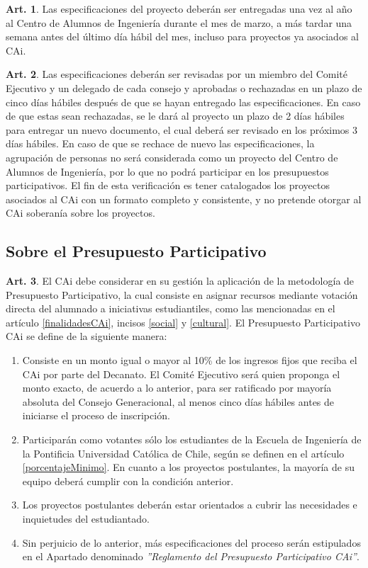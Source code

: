 \documentclass[letterpaper,11pt]{article}
\theoremstyle{definition}%
\newtheorem{art}{Art.} %
\begin{document}
\begin{art}
	Las especificaciones del proyecto deberán ser entregadas una vez al año al Centro de Alumnos de Ingeniería durante el mes de marzo, a más tardar una semana antes del último día hábil del mes, incluso para proyectos ya asociados al CAi.
\end{art}

\begin{art}
	Las especificaciones deberán ser revisadas por un miembro del Comité Ejecutivo y un delegado de cada consejo y aprobadas o rechazadas en un plazo de cinco días hábiles después de que se hayan entregado las especificaciones. En caso de que estas sean rechazadas, se le dará al proyecto un plazo de 2 días hábiles para entregar un nuevo documento, el cual deberá ser revisado en los próximos 3 días hábiles. En caso de que se rechace de nuevo las especificaciones, la agrupación de personas no será considerada como un proyecto del Centro de Alumnos de Ingeniería, por lo que no podrá participar en los presupuestos participativos. El fin de esta verificación es tener catalogados los proyectos asociados al CAi con un formato completo y consistente, y no pretende otorgar al CAi soberanía sobre los proyectos.
\end{art}


\subsection*{Sobre el Presupuesto Participativo}

\begin{art}\label{definicionPParticipativo1}
	El CAi debe considerar en su gestión la aplicación de la metodología de Presupuesto Participativo, la cual consiste en asignar recursos mediante votación directa del alumnado a iniciativas estudiantiles, como las mencionadas en el artículo \ref{finalidadesCAi}, incisos \ref{social} y \ref{cultural}. El Presupuesto Participativo CAi se define de la siguiente manera:
	\begin{enumerate}
		\item Consiste en un monto igual o mayor al 10\% de los ingresos fijos que reciba el CAi por parte del Decanato. El Comité Ejecutivo será quien proponga el monto exacto, de acuerdo a lo anterior, para ser ratificado por mayoría absoluta del Consejo Generacional, al menos cinco días hábiles antes de iniciarse el proceso de inscripción.
		\item Participarán como votantes sólo los estudiantes de la Escuela de Ingeniería de la Pontificia Universidad Católica de Chile, según se definen en el artículo \ref{porcentajeMinimo}. En cuanto a los proyectos postulantes, la mayoría de su equipo deberá cumplir con la condición anterior.
		\item Los proyectos postulantes deberán estar orientados a cubrir las necesidades e inquietudes del estudiantado.
		\item Sin perjuicio de lo anterior, más especificaciones del proceso serán estipulados en el Apartado denominado \textit{''Reglamento del Presupuesto Participativo CAi''}.
	\end{enumerate}
\end{art}
\end{document}
